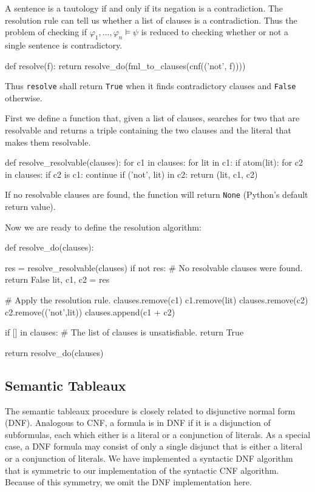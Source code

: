 \documentclass[a4paper,notitlepage]{scrartcl}
\let\phi\varphi
\begin{document}
A sentence is a tautology if and only if its negation is a contradiction.
The resolution rule can tell us whether a list of clauses is a contradiction.
Thus the problem of checking if $\phi_1,...,\phi_n\models\psi$ is reduced
   to checking whether or not a single sentence is contradictory.

\begin{code}
def resolve(f):
    return resolve_do(fml_to_clauses(cnf(('not', f))))
\end{code}

Thus \texttt{resolve} shall return \texttt{True} when it finds 
   contradictory clauses and \texttt{False} otherwise.

First we define a function that, given a list of clauses, searches for two
   that are resolvable and returns a triple containing the two clauses
   and the literal that makes them resolvable.

\begin{code}
def resolve_resolvable(clauses):
    for c1 in clauses:
        for lit in c1:
            if atom(lit):
                for c2 in clauses:
                    if c2 is c1:
                        continue
                    if ('not', lit) in c2:
                        return (lit, c1, c2)
\end{code}
If no resolvable clauses are found, the function will return \texttt{None}
   (Python's default return value).

Now we are ready to define the resolution algorithm:

\begin{code}
def resolve_do(clauses):

    res = resolve_resolvable(clauses)
    if not res:
        # No resolvable clauses were found.
        return False
    lit, c1, c2 = res

    # Apply the resolution rule.
    clauses.remove(c1)
    c1.remove(lit)
    clauses.remove(c2)
    c2.remove(('not',lit))
    clauses.append(c1 + c2)

    if [] in clauses:
        # The list of clauses is unsatisfiable.
        return True

    return resolve_do(clauses)
\end{code}

\subsection{Semantic Tableaux}

The semantic tableaux procedure is closely related to disjunctive normal form
(DNF). Analogous to CNF, a formula is in DNF if it is a disjunction of
subformulas, each which either is a literal or a conjunction of literals. As a
special case, a DNF formula may consist of only a single disjunct that is
either a literal or a conjunction of literals. We have implemented a syntactic
DNF algorithm that is symmetric to our implementation of the syntactic CNF
algorithm. Because of this symmetry, we omit the DNF implementation here.
\end{document}
